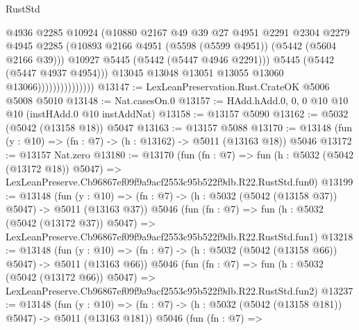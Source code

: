 \begin{lexlean}{RustStd}
\begin{coremodule}
                                    @4936
                                    @2285
                                    @10924
                                    (@10880
                                      @2167
                                      @49
                                      @39
                                      @27
                                      @4951
                                      @2291
                                      @2304
                                      @2279
                                      @4945
                                      @2285
                                      (@10893
                                        @2166
                                        @4951
                                        (@5598 (@5599 @4951))
                                        (@5442 (@5604 @2166 @39)))
                                      @10927
                                      @5445
                                      (@5442 (@5447 @4946 @2291)))
                                    @5445
                                    (@5442 (@5447 @4937 @4954)))
                                  @13045
                                  @13048
                                  @13051
                                  @13055
                                  @13060
                                  @13066)))))))))))))))
@13147 := LexLeanPreservation.Rust.CrateOK @5006 @5008 @5010
@13148 := Nat.casesOn.{0}
@13157 := HAdd.hAdd.{0, 0, 0} @10 @10 @10 (instHAdd.{0} @10 instAddNat)
@13158 := @13157 @5090
@13162 := @5032 (@5042 (@13158 @18)) @5047
@13163 := @13157 @5088
@13170 := @13148 (fun (y : @10) => (fn : @7) -> (h : @13162) -> @5011 (@13163 @18)) @5046
@13172 := @13157 Nat.zero
@13180 := @13170
    (fun (fn : @7) =>
    fun (h : @5032 (@5042 (@13172 @18)) @5047) =>
    LexLeanPreserve.Cb96867ef09f9a9acf2553c95b522f9db.R22.RustStd.fun0)
@13199 := @13148
    (fun (y : @10) => (fn : @7) -> (h : @5032 (@5042 (@13158 @37)) @5047) -> @5011 (@13163 @37))
    @5046
    (fun (fn : @7) =>
    fun (h : @5032 (@5042 (@13172 @37)) @5047) =>
    LexLeanPreserve.Cb96867ef09f9a9acf2553c95b522f9db.R22.RustStd.fun1)
@13218 := @13148
    (fun (y : @10) => (fn : @7) -> (h : @5032 (@5042 (@13158 @66)) @5047) -> @5011 (@13163 @66))
    @5046
    (fun (fn : @7) =>
    fun (h : @5032 (@5042 (@13172 @66)) @5047) =>
    LexLeanPreserve.Cb96867ef09f9a9acf2553c95b522f9db.R22.RustStd.fun2)
@13237 := @13148
    (fun (y : @10) => (fn : @7) -> (h : @5032 (@5042 (@13158 @181)) @5047) -> @5011 (@13163 @181))
    @5046
    (fun (fn : @7) =>

\end{coremodule}
\end{lexlean}
